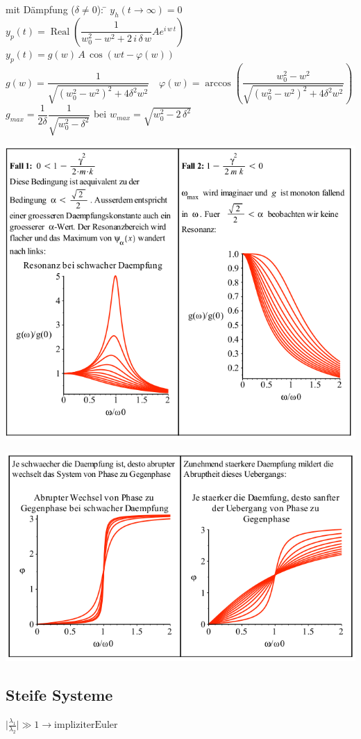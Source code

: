 \begin{tabbing}
mit Dämpfung ($\delta \neq 0$): \= $y_h(t \rightarrow \infty) = 0$\\
\> $y_p(t)= \operatorname{Real}\left(\dfrac{1}{w_0^2-w^2 + 2\,i\,\delta\,w}Ae^{i\,w\,t}\right)$\\
\> $y_p(t)= g(w)\,A\,\cos(wt-\varphi(w))$\\
\> $g(w)=\dfrac{1}{\sqrt{(w_0^2-w^2)^2+4\delta^2w^2}} \quad \varphi(w)=\arccos(\dfrac{w_0^2-w^2}{\sqrt{(w_0^2-w^2)^2+4\delta^2w^2}})$\\
\> $g_{max}=\dfrac{1}{2\delta} \dfrac{1}{\sqrt{w_0^2-\delta^2}}$ bei $w_{max}=\sqrt{w_0^2-2\,\delta^2}$
\end{tabbing}
\begin{minipage}[h]{0.5\textwidth} 
	\includegraphics[width=1.0\textwidth]{images/Erzwungen1.png}
\end{minipage}
\begin{minipage}[h]{0.5\textwidth}
	\includegraphics[width=1.0\textwidth]{images/Erzwungen2.png}
\end{minipage}

\subsection{Steife Systeme}
$	\lvert\frac{\lambda_1}{\lambda_2}\rvert \gg 1 \rightarrow \mathrm{impliziter Euler}$

